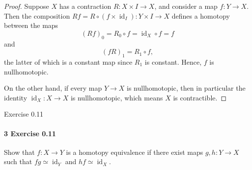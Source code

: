 \documentclass[12pt]{article}
\newlength{\myparskip}
\newenvironment{fullbox}{\begin{lrbox}{\savefullbox}\begin{minipage}{\dimexpr\textwidth-2\fboxsep\relax}\setlength{\parskip}{\myparskip}}{\end{minipage}\end{lrbox}\framebox[\textwidth]{\usebox{\savefullbox}}}
\newenvironment{pbox}[1][]{\begin{fullbox}\ifx#1\empty\else\paragraph{#1}\phantom{}\fi}{\end{fullbox}}
\theoremstyle{definition}
\newcommand{\<}{\langle}
\renewcommand{\>}{\rangle}
\DeclareMathOperator{\id}{id}
\newcommand{\htpy}{\simeq}
\begin{document}
\begin{proof}
    Suppose $X$ has a contraction $R : X \times I \to X$, and consider a map $f : Y \to X$.
    Then the composition $Rf = R \circ (f \times \id_I) : Y \times I \to X$ defines a homotopy between the maps
    \[
        (Rf)_0 = R_0 \circ f = \id_X \circ f = f
    \]
    and
    \[
        (fR)_1 = R_1 \circ f,
    \]
    the latter of which is a constant map since $R_1$ is constant.
    Hence, $f$ is nullhomotopic.

    On the other hand, if every map $Y \to X$ is nullhomotopic, then in particular the identity $\id_X : X \to X$ is nullhomotopic, which means $X$ is contractible.
\end{proof}



\newpage
\begin{pbox}[3 Exercise 0.11]
    Show that $f : X \to Y$ is a homotopy equivalence if there exist maps $g, h : Y \to X$ such that $fg \htpy \id_Y$ and $hf \htpy \id_X$.
    
\end{pbox}
\end{document}
